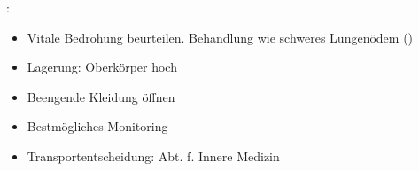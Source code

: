
\label{m:lungenoedem-leicht}

:

\begin{itemize}
  \item Vitale Bedrohung beurteilen. {\TxBeiVit} Behandlung
  wie schweres Lungenödem ()
  \item Lagerung: Oberkörper hoch
  \item Beengende Kleidung öffnen
  \item Bestmögliches Monitoring
  \item Transportentscheidung: Abt. f. Innere Medizin
\end{itemize}
